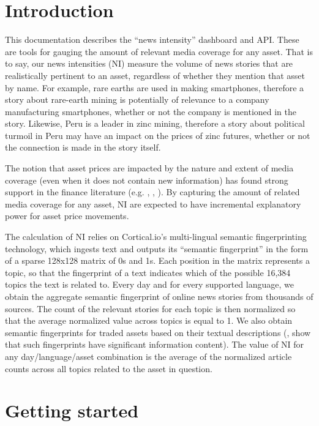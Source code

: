 \documentclass[]{book}
\title{}
\author{}
\date{}
\theoremstyle{definition}
\theoremstyle{definition}
\theoremstyle{definition}
\theoremstyle{remark}
\begin{document}
{
\setcounter{tocdepth}{1}
\tableofcontents
}
\chapter{Introduction}\label{intro}

This documentation describes the ``news intensity'' dashboard and API.
These are tools for gauging the amount of relevant media coverage for
any asset. That is to say, our news intensities (NI) measure the volume
of news stories that are realistically pertinent to an asset, regardless
of whether they mention that asset by name. For example, rare earths are
used in making smartphones, therefore a story about rare-earth mining is
potentially of relevance to a company manufacturing smartphones, whether
or not the company is mentioned in the story. Likewise, Peru is a leader
in zinc mining, therefore a story about political turmoil in Peru may
have an impact on the prices of zinc futures, whether or not the
connection is made in the story itself.

The notion that asset prices are impacted by the nature and extent of
media coverage (even when it does not contain new information) has found
strong support in the finance literature (e.g.
\citet{huberman2001contagious}, \citet{engelberg2011causal},
\citet{tetlock2011all}). By capturing the amount of related media
coverage for any asset, NI are expected to have incremental explanatory
power for asset price movements.

The calculation of NI relies on Cortical.io's multi-lingual semantic
fingerprinting technology, which ingests text and outputs its ``semantic
fingerprint'' in the form of a sparse 128x128 matrix of 0s and 1s. Each
position in the matrix represents a topic, so that the fingerprint of a
text indicates which of the possible 16,384 topics the text is related
to. Every day and for every supported language, we obtain the aggregate
semantic fingerprint of online news stories from thousands of sources.
The count of the relevant stories for each topic is then normalized so
that the average normalized value across topics is equal to 1. We also
obtain semantic fingerprints for traded assets based on their textual
descriptions (\citet{ibriyamova2017using},
\citet{ibriyamova2018predicting} show that such fingerprints have
significant information content). The value of NI for any
day/language/asset combination is the average of the normalized article
counts across all topics related to the asset in question.

\chapter{Getting started}\label{gettinstarted}
\end{document}
